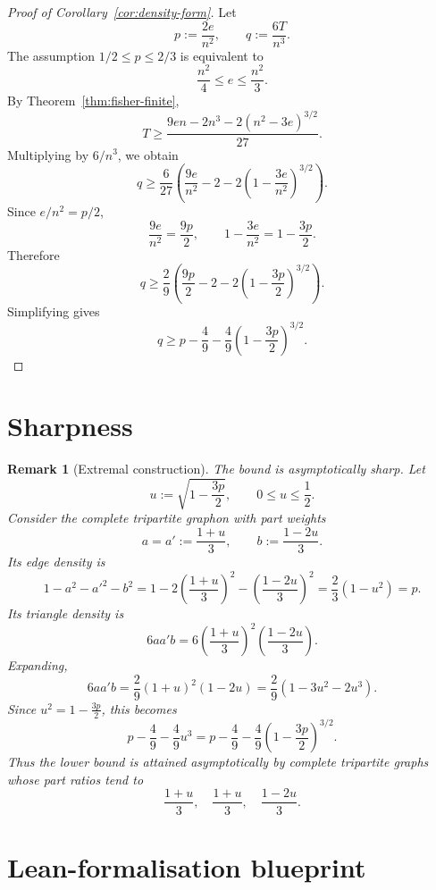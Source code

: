 \documentclass[11pt]{article}
\newtheorem{remark}[theorem]{Remark}
\begin{document}
\begin{proof}[Proof of Corollary~\ref{cor:density-form}]
Let
\[
        p:=\frac{2e}{n^2},
        \qquad
        q:=\frac{6T}{n^3}.
\]
The assumption \(1/2\le p\le 2/3\) is equivalent to
\[
        \frac{n^2}{4}\le e\le \frac{n^2}{3}.
\]
By Theorem~\ref{thm:fisher-finite},
\[
        T
        \ge
        \frac{9en-2n^3-2(n^2-3e)^{3/2}}{27}.
\]
Multiplying by \(6/n^3\), we obtain
\[
        q
        \ge
        \frac{6}{27}
        \left(
            \frac{9e}{n^2}
            -2
            -2\left(1-\frac{3e}{n^2}\right)^{3/2}
        \right).
\]
Since \(e/n^2=p/2\),
\[
        \frac{9e}{n^2}=\frac{9p}{2},
        \qquad
        1-\frac{3e}{n^2}=1-\frac{3p}{2}.
\]
Therefore
\[
        q
        \ge
        \frac{2}{9}
        \left(
            \frac{9p}{2}
            -2
            -2\left(1-\frac{3p}{2}\right)^{3/2}
        \right).
\]
Simplifying gives
\[
        q
        \ge
        p-\frac49-\frac49\left(1-\frac{3p}{2}\right)^{3/2}.
\]
\end{proof}

\section{Sharpness}

\begin{remark}[Extremal construction]
The bound is asymptotically sharp.  Let
\[
        u:=\sqrt{1-\frac{3p}{2}},
        \qquad 0\le u\le \frac12.
\]
Consider the complete tripartite graphon with part weights
\[
        a=a':=\frac{1+u}{3},
        \qquad
        b:=\frac{1-2u}{3}.
\]
Its edge density is
\[
        1-a^2-a'^2-b^2
        =
        1-2\left(\frac{1+u}{3}\right)^2
          -\left(\frac{1-2u}{3}\right)^2
        =
        \frac{2}{3}(1-u^2)
        =
        p.
\]
Its triangle density is
\[
        6aa'b
        =
        6\left(\frac{1+u}{3}\right)^2
          \left(\frac{1-2u}{3}\right).
\]
Expanding,
\[
        6aa'b
        =
        \frac{2}{9}(1+u)^2(1-2u)
        =
        \frac{2}{9}(1-3u^2-2u^3).
\]
Since \(u^2=1-\frac{3p}{2}\), this becomes
\[
        p-\frac49-\frac49u^3
        =
        p-\frac49-\frac49\left(1-\frac{3p}{2}\right)^{3/2}.
\]
Thus the lower bound is attained asymptotically by complete tripartite graphs whose
part ratios tend to
\[
        \frac{1+u}{3},\quad
        \frac{1+u}{3},\quad
        \frac{1-2u}{3}.
\]
\end{remark}

\section{Lean-formalisation blueprint}
\end{document}
